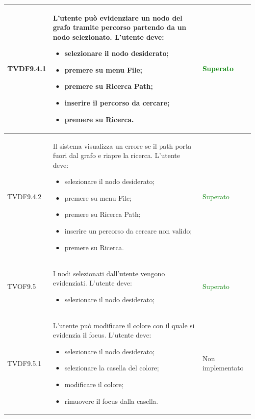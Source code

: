 \documentclass[openany,12pt,a4paper]{report}
\begin{document}
\begin{longtable}[c]{| p{2.5cm} |p{8cm} | p{2.5cm} |}
	\newline TVDF9.4.1&
	\newline L'utente può evidenziare un nodo del grafo tramite percorso partendo da un nodo selezionato. L'utente deve:
	\begin{itemize}
		\item selezionare il nodo desiderato;
		\item premere su menu File;
		\item premere su Ricerca Path;
		\item inserire il percorso da cercare;
		\item premere su Ricerca.
	\end{itemize}&
	\newline \textcolor{green}{Superato}
	\\[1em]
	\hline
	
	\newline TVDF9.4.2&
	\newline Il sistema visualizza un errore se il path porta fuori dal grafo e riapre la ricerca. L'utente deve:
	\begin{itemize}
		\item selezionare il nodo desiderato;
		\item premere su menu File;
		\item premere su Ricerca Path;
		\item inserire un percorso da cercare non valido;
		\item premere su Ricerca.
	\end{itemize}&
	\newline \textcolor{green}{Superato}
	\\[1em]
	\hline
	
	\newline TVOF9.5&
	\newline I nodi selezionati dall'utente vengono evidenziati. L'utente deve:
	\begin{itemize}
		\item selezionare il nodo desiderato;
	\end{itemize}&
	\newline \textcolor{green}{Superato}
	\\[1em]
	\hline
	
	\newline TVDF9.5.1&
	\newline L'utente può modificare il colore con il quale si evidenzia il focus. L'utente deve:
	\begin{itemize}
		\item selezionare il nodo desiderato;
		\item selezionare la casella del colore;
		\item modificare il colore;
		\item rimuovere il focus dalla casella.
	\end{itemize}&
	\newline Non implementato
	\\[1em]
	\hline
	

\end{longtable}
\end{document}
